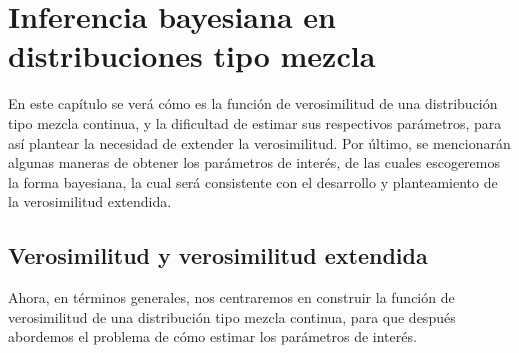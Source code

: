 \chapter{Inferencia bayesiana en distribuciones tipo mezcla}
En este capítulo se verá cómo es la función de verosimilitud de una distribución tipo mezcla continua, y la dificultad de estimar sus respectivos parámetros, para así plantear la necesidad de extender la verosimilitud. Por último, se mencionarán algunas maneras de obtener los parámetros de interés, de las cuales escogeremos la forma bayesiana, la cual será consistente con el desarrollo y planteamiento de la verosimilitud extendida.\\




\section{Verosimilitud y verosimilitud extendida}

Ahora, en términos generales, nos centraremos en construir la función de verosimilitud de una distribución tipo mezcla continua, para que después abordemos el problema
de cómo estimar los parámetros de interés.\\

